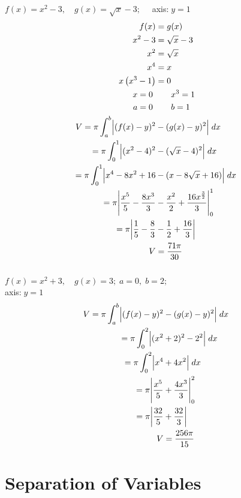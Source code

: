 \documentclass[12pt]{article}
\begin{document}
\begin{multicols}{2}
\begin{center}
\columnbreak
    $f(x)=x^2-3,\quad g(x)=\sqrt{x}-3;\quad$ axis:$\;y=1$
    \begin{align*}
        f(x) &= g(x) \\
        x^2-3&=\sqrt{x}-3 \\
        x^2&=\sqrt{x}\\
        x^4&=x\\
        x\left(x^3-1\right)&=0\\
        x=0\ &\qquad\! x^3=1 \\
        a=0\ &\qquad\! b=1 \\
        V=\pi\int^b_a\Bigl|(f(x)-y)^2 &-(g(x)-y)^2\Bigr|\;dx \\
        =\pi\int^1_0\Bigl|(x^2-4)^2 &-(\sqrt{x}-4)^2\Bigr|\;dx \\
        =\pi\int^1_0\Bigl|x^4-8x^2+16 &-(x-8\sqrt{x}+16)\Bigr|\;dx \\
        =\pi\Biggl|\frac{x^5}{5}-\frac{8x^3}{3} &- \frac{x^2}{2}+\frac{16x^{\frac{3}{2}}}{3}\Biggr|^1_0 \\
        =\pi\biggl|\frac{1}{5}-\frac{8}{3}&-\frac{1}{2}+\frac{16}{3}\biggr| \\
        V&=\frac{71\pi}{30} \\
    \end{align*} 
    \vspace{3pt}\\
    $f(x)=x^2+3,\quad g(x)=3;\;a=0,\;b=2;$\\
    \raggedleft axis:$\;y=1\quad$ 
    \begin{align*}
        V=\pi\int^b_a\Bigl|(f(x)-y)^2 &-(g(x)-y)^2\Bigr|\;dx \\
        =\pi\int^2_0\Bigl|(x^2&+2)^2 -2^2\Bigr|\;dx \\
        =\pi\int^2_0\Bigl|x^4&+4x^2\Bigr|\;dx \\
        =\pi\Biggl|\frac{x^5}{5}&+\frac{4x^3}{3} \Biggr|^2_0 \\
        =\pi\biggl|\frac{32}{5}&+\frac{32}{3}\biggr| \\
        V&=\frac{256\pi}{15} \\ 
    \end{align*} 
\end{center}
\end{multicols}

\newpage
\section{Separation of Variables}
\end{document}
